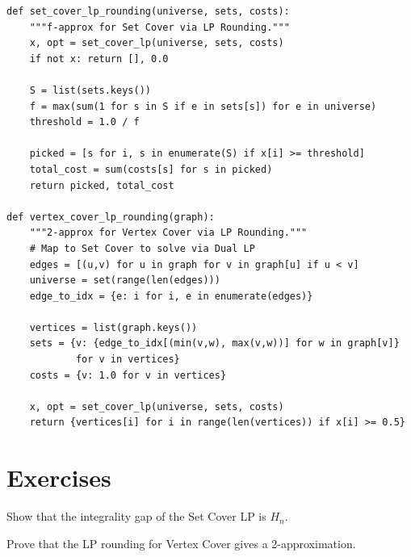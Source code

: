 \begin{lstlisting}[style=python, caption=LP Rounding for Set Cover]
def set_cover_lp_rounding(universe, sets, costs):
    """f-approx for Set Cover via LP Rounding."""
    x, opt = set_cover_lp(universe, sets, costs)
    if not x: return [], 0.0
    
    S = list(sets.keys())
    f = max(sum(1 for s in S if e in sets[s]) for e in universe)
    threshold = 1.0 / f
    
    picked = [s for i, s in enumerate(S) if x[i] >= threshold]
    total_cost = sum(costs[s] for s in picked)
    return picked, total_cost

def vertex_cover_lp_rounding(graph):
    """2-approx for Vertex Cover via LP Rounding."""
    # Map to Set Cover to solve via Dual LP
    edges = [(u,v) for u in graph for v in graph[u] if u < v]
    universe = set(range(len(edges)))
    edge_to_idx = {e: i for i, e in enumerate(edges)}
    
    vertices = list(graph.keys())
    sets = {v: {edge_to_idx[(min(v,w), max(v,w))] for w in graph[v]} 
            for v in vertices}
    costs = {v: 1.0 for v in vertices}
    
    x, opt = set_cover_lp(universe, sets, costs)
    return {vertices[i] for i in range(len(vertices)) if x[i] >= 0.5}
\end{lstlisting}

\section{Exercises}
\begin{exercise}
Show that the integrality gap of the Set Cover LP is $H_n$.
\end{exercise}
\begin{exercise}
Prove that the LP rounding for Vertex Cover gives a 2-approximation.
\end{exercise}

